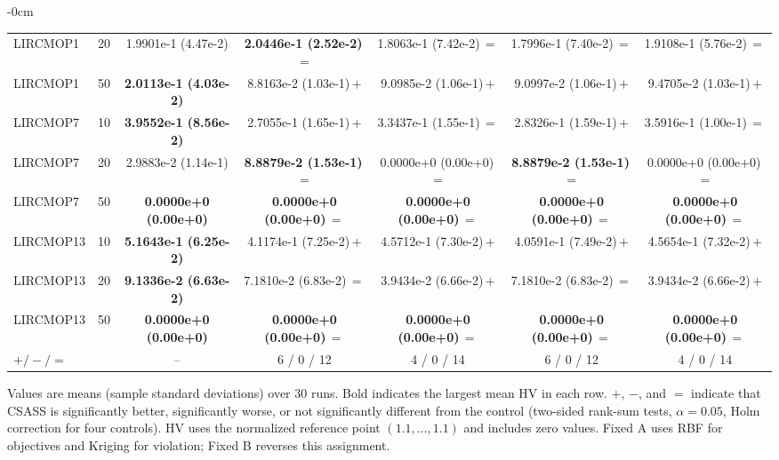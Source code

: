 \begin{table}[!htbp]
\begin{ROneBlock}
\begin{adjustwidth}{-\extralength}{0cm}
\begin{tabular*}{\linewidth}{@{\extracolsep{\fill}}lcccccc@{}}
LIRCMOP1 & 20 & 1.9901e-1 (4.47e-2) & \textbf{2.0446e-1 (2.52e-2)}\,$=$ & 1.8063e-1 (7.42e-2)\,$=$ & 1.7996e-1 (7.40e-2)\,$=$ & 1.9108e-1 (5.76e-2)\,$=$ \\
LIRCMOP1 & 50 & \textbf{2.0113e-1 (4.03e-2)} & 8.8163e-2 (1.03e-1)\,$+$ & 9.0985e-2 (1.06e-1)\,$+$ & 9.0997e-2 (1.06e-1)\,$+$ & 9.4705e-2 (1.03e-1)\,$+$ \\
LIRCMOP7 & 10 & \textbf{3.9552e-1 (8.56e-2)} & 2.7055e-1 (1.65e-1)\,$+$ & 3.3437e-1 (1.55e-1)\,$=$ & 2.8326e-1 (1.59e-1)\,$+$ & 3.5916e-1 (1.00e-1)\,$=$ \\
LIRCMOP7 & 20 & 2.9883e-2 (1.14e-1) & \textbf{8.8879e-2 (1.53e-1)}\,$=$ & 0.0000e+0 (0.00e+0)\,$=$ & \textbf{8.8879e-2 (1.53e-1)}\,$=$ & 0.0000e+0 (0.00e+0)\,$=$ \\
LIRCMOP7 & 50 & \textbf{0.0000e+0 (0.00e+0)} & \textbf{0.0000e+0 (0.00e+0)}\,$=$ & \textbf{0.0000e+0 (0.00e+0)}\,$=$ & \textbf{0.0000e+0 (0.00e+0)}\,$=$ & \textbf{0.0000e+0 (0.00e+0)}\,$=$ \\
LIRCMOP13 & 10 & \textbf{5.1643e-1 (6.25e-2)} & 4.1174e-1 (7.25e-2)\,$+$ & 4.5712e-1 (7.30e-2)\,$+$ & 4.0591e-1 (7.49e-2)\,$+$ & 4.5654e-1 (7.32e-2)\,$+$ \\
LIRCMOP13 & 20 & \textbf{9.1336e-2 (6.63e-2)} & 7.1810e-2 (6.83e-2)\,$=$ & 3.9434e-2 (6.66e-2)\,$+$ & 7.1810e-2 (6.83e-2)\,$=$ & 3.9434e-2 (6.66e-2)\,$+$ \\
LIRCMOP13 & 50 & \textbf{0.0000e+0 (0.00e+0)} & \textbf{0.0000e+0 (0.00e+0)}\,$=$ & \textbf{0.0000e+0 (0.00e+0)}\,$=$ & \textbf{0.0000e+0 (0.00e+0)}\,$=$ & \textbf{0.0000e+0 (0.00e+0)}\,$=$ \\
\midrule
$+/-/=$ &  & -- & 6 / 0 / 12 & 4 / 0 / 14 & 6 / 0 / 12 & 4 / 0 / 14 \\
\bottomrule
\end{tabular*}
\vspace{4pt}
\parbox{\linewidth}{\footnotesize Values are means (sample standard deviations) over 30 runs. Bold indicates the largest mean HV in each row. $+$, $-$, and $=$ indicate that CSASS is significantly better, significantly worse, or not significantly different from the control (two-sided rank-sum tests, $\alpha=0.05$, Holm correction for four controls). HV uses the normalized reference point $(1.1,\ldots,1.1)$ and includes zero values. Fixed A uses RBF for objectives and Kriging for violation; Fixed B reverses this assignment.}
\end{adjustwidth}
\end{ROneBlock}
\end{table}
